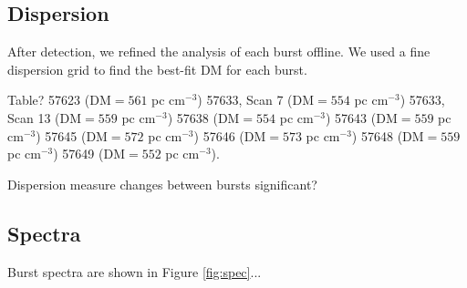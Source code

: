 \documentclass{emulateapj}
\begin{document}
\subsection{Dispersion}

After detection, we refined the analysis of each burst offline. We used a fine dispersion grid to find the best-fit DM for each burst.

Table?
57623 (DM$=561$ pc cm$^{-3}$)
57633, Scan 7 (DM$=554$ pc cm$^{-3}$)
57633, Scan 13 (DM$=559$ pc cm$^{-3}$)
57638 (DM$=554$ pc cm$^{-3}$)
57643 (DM$=559$ pc cm$^{-3}$)
57645 (DM$=572$ pc cm$^{-3}$)
57646 (DM$=573$ pc cm$^{-3}$)
57648 (DM$=559$ pc cm$^{-3}$)
57649 (DM$=552$ pc cm$^{-3}$).

Dispersion measure changes between bursts significant?

\subsection{Spectra}

Burst spectra are shown in Figure \ref{fig:spec}...
\end{document}
